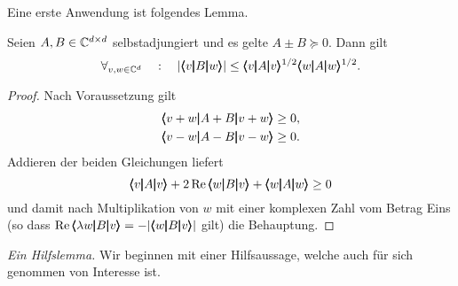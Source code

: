 Eine erste Anwendung ist folgendes Lemma.

\begin{lem}\label{Matrizenlemma}
	Seien $A,B\in\mathbb C^{d\times d}$ selbstadjungiert und es gelte $A\pm B \succeq 0$. Dann gilt
	\begin{equation}
		\forall_{v,w \in \mathbb{C}^d} \quad: \quad \vert \pmb\langle v\pmb|B\pmb|w\pmb\rangle \vert \le \pmb\langle v\pmb|A\pmb|v\pmb\rangle^{{1}/{2}}\pmb\langle w\pmb|A\pmb|w\pmb\rangle^{{1}/{2}}. 
	\end{equation}
\end{lem}
\begin{proof}
	Nach Voraussetzung gilt
	\begin{equation}\begin{split}
		&\pmb\langle v+w\pmb|A+B\pmb|v+w\pmb\rangle \ge 0,\\
		&\pmb\langle v-w\pmb|A-B\pmb|v-w\pmb\rangle \ge 0.
		\end{split}
	\end{equation}
	Addieren der beiden Gleichungen liefert
	\begin{equation}
		\pmb\langle v\pmb|A\pmb|v\pmb\rangle+2\operatorname{Re} \pmb\langle w\pmb|B\pmb|v\pmb\rangle +\pmb\langle w\pmb|A\pmb|w\pmb\rangle \ge 0
	\end{equation}
	und damit nach Multiplikation von $w$ mit einer komplexen Zahl vom Betrag Eins (so dass $\operatorname{Re} \pmb\langle\lambda w\pmb|B\pmb|v\pmb\rangle = - | \pmb\langle w\pmb|B\pmb|v\pmb\rangle|$ gilt) die Behauptung. 
\end{proof}

\medskip\noindent
{\em Ein Hilfslemma.} Wir beginnen mit einer Hilfsaussage, welche auch für sich genommen von Interesse ist. 


